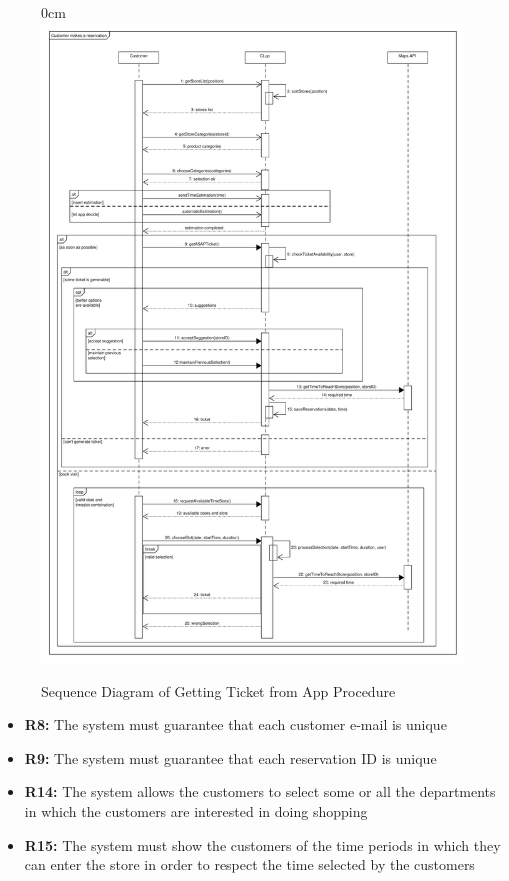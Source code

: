 \documentclass{article}
\begin{document}
\begin{center}
							\begin{figure}
								\begin{adjustwidth} {0cm}{}
									\centering
									\includegraphics[scale=0.343]{SD/5_makeReservation.pdf}\\
									\caption{Sequence Diagram of Getting Ticket from App Procedure}
								\end{adjustwidth}
							\end{figure}

\begin{itemize}
					\bigskip
					\bigskip
					\bigskip
					 {\bfseries Required functional requirements: }


					\item {\bfseries R8: }  The system must guarantee that each customer e-mail is unique
					\item {\bfseries R9: } The system must guarantee that each reservation ID is unique
					\item {\bfseries R14: } The system allows the customers to select some or all the departments in
which the customers are interested in doing shopping
					\item {\bfseries R15: } The system must show the customers of the time periods in which they can
enter the store in order to respect the time selected by the customers


\end{itemize}
\end{center}
\end{document}
